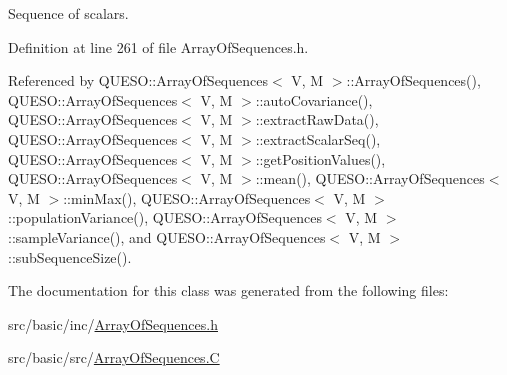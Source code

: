 Sequence of scalars. 



Definition at line 261 of file Array\-Of\-Sequences.\-h.



Referenced by Q\-U\-E\-S\-O\-::\-Array\-Of\-Sequences$<$ V, M $>$\-::\-Array\-Of\-Sequences(), Q\-U\-E\-S\-O\-::\-Array\-Of\-Sequences$<$ V, M $>$\-::auto\-Covariance(), Q\-U\-E\-S\-O\-::\-Array\-Of\-Sequences$<$ V, M $>$\-::extract\-Raw\-Data(), Q\-U\-E\-S\-O\-::\-Array\-Of\-Sequences$<$ V, M $>$\-::extract\-Scalar\-Seq(), Q\-U\-E\-S\-O\-::\-Array\-Of\-Sequences$<$ V, M $>$\-::get\-Position\-Values(), Q\-U\-E\-S\-O\-::\-Array\-Of\-Sequences$<$ V, M $>$\-::mean(), Q\-U\-E\-S\-O\-::\-Array\-Of\-Sequences$<$ V, M $>$\-::min\-Max(), Q\-U\-E\-S\-O\-::\-Array\-Of\-Sequences$<$ V, M $>$\-::population\-Variance(), Q\-U\-E\-S\-O\-::\-Array\-Of\-Sequences$<$ V, M $>$\-::sample\-Variance(), and Q\-U\-E\-S\-O\-::\-Array\-Of\-Sequences$<$ V, M $>$\-::sub\-Sequence\-Size().



The documentation for this class was generated from the following files\-:\begin{DoxyCompactItemize}
\item 
src/basic/inc/\hyperlink{_array_of_sequences_8h}{Array\-Of\-Sequences.\-h}\item 
src/basic/src/\hyperlink{_array_of_sequences_8_c}{Array\-Of\-Sequences.\-C}\end{DoxyCompactItemize}
